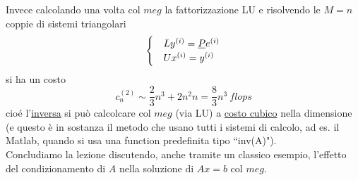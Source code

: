 \documentclass[12pt,a4paper]{article}
\begin{document}
Invece calcolando una volta col $meg$ la fattorizzazione LU e risolvendo le $M=n$ coppie di sistemi triangolari
\begin{equation*}
    \begin{cases}
        & Ly^{(i)} = \uline{P}e^{(i)} \\
        & Ux^{(i)} = y^{(i)}
    \end{cases}
\end{equation*}
si ha un costo 
\begin{equation*}
    c_n^{(2)} \sim \frac{2}{3}n^3 + 2n^2n = \frac{8}{3}n^3 \ flops
\end{equation*}
cioé l'\uline{inversa} si può calcolcare col \uline{$meg$} (via LU) a \uline{costo cubico} nella dimensione (e questo è in sostanza il metodo che usano tutti i sistemi di calcolo, ad es. il Matlab, quando si usa una function predefinita tipo ``inv(A)").\\
Concludiamo la lezione discutendo, anche tramite un classico esempio, l'effetto del condizionamento di $A$ nella soluzione di $Ax=b$ col $meg$.
\end{document}
